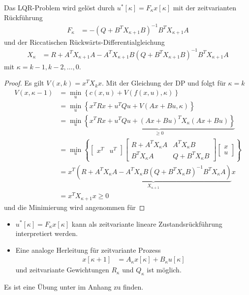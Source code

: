 \begin{satz}
Das \ac{LQR}-Problem wird gelöst durch $u^{\ast}[\kappa]=F_{\kappa}x[\kappa]$ mit der zeitvarianten Rückführung 
\begin{align*}
	F_{\kappa} & = -\left(Q + B^TX_{\kappa + 1}B \right)^{-1}B^TX_{\kappa + 1}A
\end{align*}
und der Riccatischen Rückwärts-Differentialgleichung
\begin{align}
	X_{\kappa} & = R + A^TX_{\kappa + 1}A-A^TX_{\kappa + 1} B\left(Q+B^TX_{\kappa + 1}B \right)^{-1}B^TX_{\kappa + 1} A 
\end{align}
mit $\kappa = k-1, k-2,\ldots,0$.
\end{satz}
\begin{proof}
	Es gilt $V(x,k)=x^TX_kx$. Mit der Gleichung der \ac{DP} und  folgt für $\kappa = k$
	\begin{align*}
		V(x,\kappa - 1) & = \min\limits_u\left\{c(x,u)+V\left(f(x,u),\kappa \right) \right\}\\
		& = \min\limits_u\left\{x^TRx + u^TQu + V\left(Ax + Bu, \kappa \right) \right\}\\
		& = \min\limits_u\underbrace{\left\{x^TRx + u^TQu + (Ax+Bu)^TX_{\kappa}(Ax+Bu) \right\}}_{\geq 0}\\
		& = \min\limits_u\left\{\begin{bmatrix}
		x^T & u^T
		\end{bmatrix}\begin{bmatrix}
		R+A^TX_{\kappa}A	& A^TX_{\kappa} B\\
		B^TX_{\kappa} A		& Q+B^TX_{\kappa}B
		\end{bmatrix}\begin{bmatrix}
		x\\ u
		\end{bmatrix} \right\}\\
		& = x^T\underbrace{\left(R+A^TX_{\kappa}A - A^TX_{\kappa}B\left(Q+B^TX_{\kappa}B \right)^{-1}B^TX_{\kappa}A \right)}_{X_{\kappa +1}}x\\
		& = x^TX_{\kappa +1}x \geq 0
	\end{align*}
	und die Minimierung wird angenommen für %
\end{proof}
\begin{remark}\hspace{1mm}
\begin{itemize}
  \item $u^{\ast}[\kappa]=F_{\kappa}x[\kappa]$ kann als zeitvariante lineare Zustandsrückführung interpretiert werden. 
  \item Eine analoge Herleitung für zeitvariante Prozess
  \begin{align*}
  	x[\kappa + 1] & = A_{\kappa}x[\kappa] + B_{\kappa}u[\kappa]
  \end{align*}
  und zeitvariante Gewichtungen $R_{\kappa}$ und $Q_{\kappa}$ ist möglich.
\end{itemize}
\end{remark}
Es ist eine Übung unter  im Anhang zu finden.

